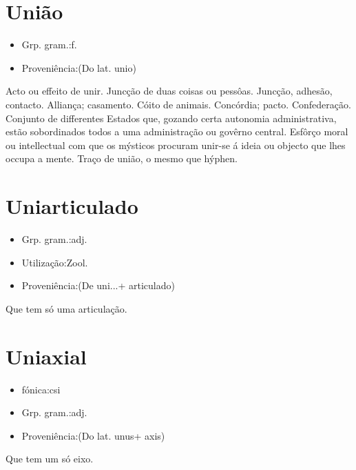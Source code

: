 \documentclass{article}
\begin{document}
\section{União}
\begin{itemize}
\item {Grp. gram.:f.}
\end{itemize}
\begin{itemize}
\item {Proveniência:(Do lat. \textunderscore unio\textunderscore )}
\end{itemize}
Acto ou effeito de unir.
Juncção de duas coisas ou pessôas.
Juncção, adhesão, contacto.
Alliança; casamento.
Cóito de animais.
Concórdia; pacto.
Confederação.
Conjunto de differentes Estados que, gozando certa autonomia administrativa, estão sobordinados todos a uma administração ou govêrno central.
Esfôrço moral ou intellectual com que os mýsticos procuram unir-se á ideia ou objecto que lhes occupa a mente.
\textunderscore Traço de união\textunderscore , o mesmo que \textunderscore hýphen\textunderscore .
\section{Uniarticulado}
\begin{itemize}
\item {Grp. gram.:adj.}
\end{itemize}
\begin{itemize}
\item {Utilização:Zool.}
\end{itemize}
\begin{itemize}
\item {Proveniência:(De \textunderscore uni...\textunderscore  + \textunderscore articulado\textunderscore )}
\end{itemize}
Que tem só uma articulação.
\section{Uniaxial}
\begin{itemize}
\item {fónica:csi}
\end{itemize}
\begin{itemize}
\item {Grp. gram.:adj.}
\end{itemize}
\begin{itemize}
\item {Proveniência:(Do lat. \textunderscore unus\textunderscore  + \textunderscore axis\textunderscore )}
\end{itemize}
Que tem um só eixo.
\end{document}
